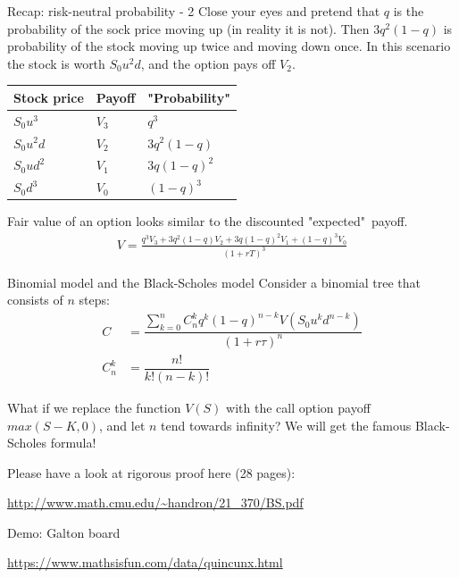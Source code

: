 \documentclass{beamer}
\begin{document}
\begin{frame}{Recap: risk-neutral probability - 2}
\justify
Close your eyes and pretend that $q$ is the probability of the sock price moving up (in reality it is not). Then $3q^2(1-q)$ is probability of the stock moving up twice and moving down once. In this scenario the stock is worth  $S_0u^2d$, and the option pays off $V_2$.

\justify
\centering
\begin{tabular}{l|l|l}
Stock price & Payoff & "Probability" \\ \hline
$S_0u^3$   & $V_3$   & $q^3$ \\
$S_0u^2d$  & $V_2$   & $3q^2(1-q)$ \\
$S_0ud^2$  & $V_1$   & $3q(1-q)^2$ \\ 
$S_0d^3$   & $V_0$   & $(1-q)^3$ 
\end{tabular}

\justify
Fair value of an option looks similar to the discounted "expected"\ payoff.
\begin{align*}
V = \frac{q^3V_3 + 3q^2(1-q)V_2 + 3q(1-q)^2V_1 + (1-q)^3V_0}{(1+rT)^3}
\end{align*}
\end{frame}



\begin{frame}{Binomial model and the Black-Scholes model}
Consider a binomial tree that consists of $n$ steps:
\begin{align*}
C &= \dfrac{\sum\limits_{k=0}^{n} C^k_nq^k(1-q)^{n-k}V(S_0u^kd^{n-k})}{(1+r\tau)^n} \\
C^k_n &= \dfrac{n!}{k!(n-k)!}
\end{align*}

\justify
What if we replace the function $V(S)$ with the call option payoff $max(S-K,0)$, and let $n$ tend towards infinity? We will get the famous Black-Scholes formula!

\justify
Please have a look at rigorous proof here (28 pages):

\url{http://www.math.cmu.edu/~handron/21_370/BS.pdf}
\end{frame}



\begin{frame}{Demo: Galton board}

\url{https://www.mathsisfun.com/data/quincunx.html}
\end{frame}
\end{document}
